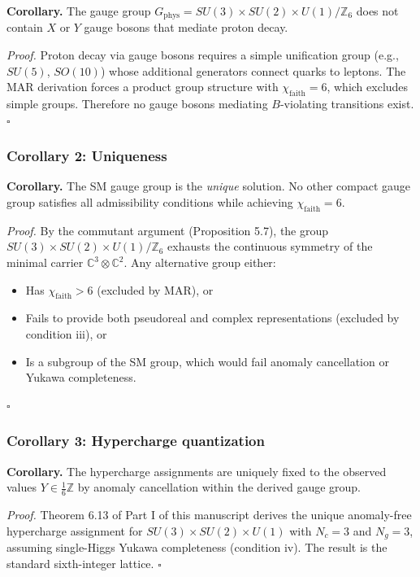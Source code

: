 \textbf{Corollary.} The gauge group \(G_{\mathrm{phys}} = SU(3) \times SU(2) \times U(1)/\mathbb{Z}_6\) does not contain \(X\) or \(Y\) gauge bosons that mediate proton decay.

\emph{Proof.} Proton decay via gauge bosons requires a simple unification group (e.g., \(SU(5)\), \(SO(10)\)) whose additional generators connect quarks to leptons. The MAR derivation forces a product group structure with \(\chi_{\mathrm{faith}} = 6\), which excludes simple groups. Therefore no gauge bosons mediating \(B\)-violating transitions exist. \(\square\)

\subsubsection{Corollary 2: Uniqueness}\label{corollary-2-uniqueness}

\textbf{Corollary.} The SM gauge group is the \emph{unique} solution. No other compact gauge group satisfies all admissibility conditions while achieving \(\chi_{\mathrm{faith}} = 6\).

\emph{Proof.} By the commutant argument (Proposition 5.7), the group \(SU(3) \times SU(2) \times U(1)/\mathbb{Z}_6\) exhausts the continuous symmetry of the minimal carrier \(\mathbb{C}^3 \otimes \mathbb{C}^2\). Any alternative group either:

\begin{itemize}
\tightlist
\item
  Has \(\chi_{\mathrm{faith}} > 6\) (excluded by MAR), or
\item
  Fails to provide both pseudoreal and complex representations (excluded by condition iii), or
\item
  Is a subgroup of the SM group, which would fail anomaly cancellation or Yukawa completeness.
\end{itemize}

\(\square\)

\subsubsection{Corollary 3: Hypercharge quantization}\label{corollary-3-hypercharge-quantization}

\textbf{Corollary.} The hypercharge assignments are uniquely fixed to the observed values \(Y \in \frac{1}{6}\mathbb{Z}\) by anomaly cancellation within the derived gauge group.

\emph{Proof.} Theorem 6.13 of Part I of this manuscript derives the unique anomaly-free hypercharge assignment for \(SU(3) \times SU(2) \times U(1)\) with \(N_c = 3\) and \(N_g = 3\), assuming single-Higgs Yukawa completeness (condition iv). The result is the standard sixth-integer lattice. \(\square\)

